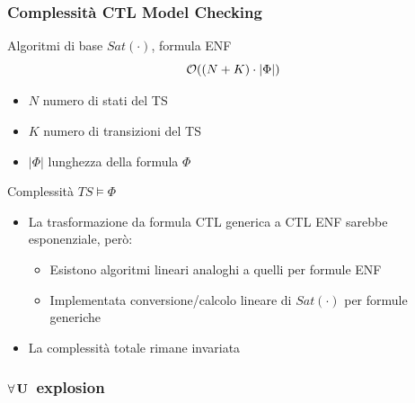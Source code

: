 \begin{frame}
  \frametitle{Complessit\`a \ac{CTL} Model Checking}
  \begin{block}{Algoritmi di base $Sat(\cdot)$, formula \ac{ENF}}
    $$
    \mathcal{O}((N+K)\cdot|\Phi|)
    $$
    \begin{itemize}
    \item $N$ numero di \alert{stati} del \ac{TS}
    \item $K$ numero di \alert{transizioni} del \ac{TS}
    \item $|\Phi|$ \alert{lunghezza} della formula $\Phi$
    \end{itemize}
  \end{block}
  \begin{block}{Complessit\`a $TS\models\Phi$}
    \begin{itemize}
    \item La trasformazione da formula \ac{CTL} generica a \ac{CTL}
      \ac{ENF} sarebbe \alert{esponenziale}, per\`o:
      \begin{itemize}
      \item Esistono algoritmi \alert{lineari} analoghi a quelli per formule \ac{ENF}
      \item Implementata conversione/calcolo \alert{lineare}
        di $Sat(\cdot)$ per formule generiche
      \end{itemize}
    \item La complessit\`a totale rimane \alert{invariata}
    \end{itemize}
  \end{block}
\end{frame}

\begin{frame}
  \frametitle{$\forall\,\mathbf{U}\,$ explosion}
  \begin{center}
  \end{center}
\end{frame}

